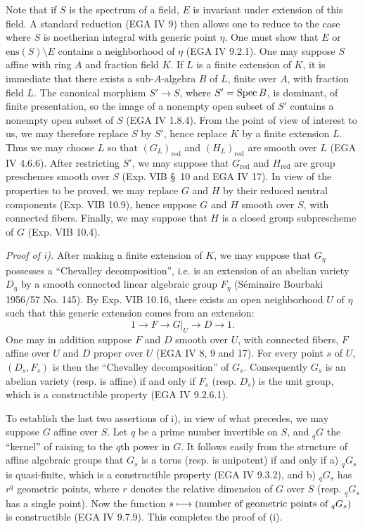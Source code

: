 Note that if $S$ is the spectrum of a field, $E$ is invariant under extension of this field. A standard reduction (EGA IV 9) then allows one to reduce to the case where $S$ is noetherian integral with generic point $\eta$. One must show that $E$ or $\mathrm{ens}(S)\setminus E$ contains a neighborhood of $\eta$ (EGA IV 9.2.1). One may suppose $S$ affine with ring $A$ and fraction field $K$. If $L$ is a finite extension of $K$, it is immediate that there exists a sub-$A$-algebra $B$ of $L$, finite over $A$, with fraction field $L$. The canonical morphism $S'\to S$, where $S'=\operatorname{Spec} B$, is dominant, of finite presentation, so the image of a nonempty open subset of $S'$ contains a nonempty open subset of $S$ (EGA IV 1.8.4). From the point of view of interest to us, we may therefore replace $S$ by $S'$, hence replace $K$ by a finite extension $L$. Thus we may choose $L$ so that $(G_L)_{\mathrm{red}}$ and $(H_L)_{\mathrm{red}}$ are smooth over $L$ (EGA IV 4.6.6). After restricting $S'$, we may suppose that $G_{\mathrm{red}}$ and $H_{\mathrm{red}}$ are group preschemes smooth over $S$ (Exp. VIB \S~10 and EGA IV 17). In view of the properties to be proved, we may replace $G$ and $H$ by their reduced neutral components (Exp. VIB 10.9), hence suppose $G$ and $H$ smooth over $S$, with connected fibers. Finally, we may suppose that $H$ is a closed group subprescheme of $G$ (Exp. VIB 10.4).

\par\noindent\emph{Proof of i).} After making a finite extension of $K$, we may suppose that $G_\eta$ possesses a ``Chevalley decomposition'', i.e. is an extension of an abelian variety $D_\eta$ by a smooth connected linear algebraic group $F_\eta$ (S\'eminaire Bourbaki 1956/57 No. 145). By Exp. VIB 10.16, there exists an open neighborhood $U$ of $\eta$ such that this generic extension comes from an extension:
\[
1\to F\to G|_U\to D\to1.
\]
One may in addition suppose $F$ and $D$ smooth over $U$, with connected fibers, $F$ affine over $U$ and $D$ proper over $U$ (EGA IV 8, 9 and 17). For every point $s$ of $U$, $(D_s,F_s)$ is then the ``Chevalley decomposition'' of $G_s$. Consequently $G_s$ is an abelian variety (resp. is affine) if and only if $F_s$ (resp. $D_s$) is the unit group, which is a constructible property (EGA IV 9.2.6.1).

To establish the last two assertions of i), in view of what precedes, we may suppose $G$ affine over $S$. Let $q$ be a prime number invertible on $S$, and ${}_qG$ the ``kernel'' of raising to the $q$th power in $G$. It follows easily from the structure of affine algebraic groups that $G_s$ is a torus (resp. is unipotent) if and only if a) ${}_qG_s$ is quasi-finite, which is a constructible property (EGA IV 9.3.2), and b) ${}_qG_s$ has $r^q$ geometric points, where $r$ denotes the relative dimension of $G$ over $S$ (resp. ${}_qG_s$ has a single point). Now the function $s\longmapsto(\text{number of geometric points of }{}_qG_s)$ is constructible (EGA IV 9.7.9). This completes the proof of (i).

